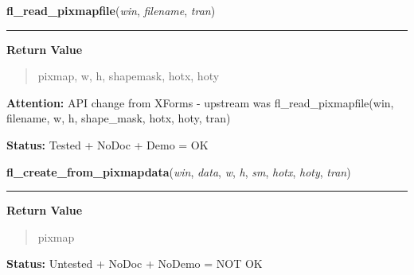 \hspace{.8\funcindent}\begin{boxedminipage}{\funcwidth}

    \raggedright \textbf{fl\_read\_pixmapfile}(\textit{win}, \textit{filename}, \textit{tran})

    \vspace{-1.5ex}

    \rule{\textwidth}{0.5\fboxrule}
\setlength{\parskip}{2ex}
\setlength{\parskip}{1ex}
      \textbf{Return Value}
    \vspace{-1ex}

      \begin{quote}
      pixmap, w, h, shapemask, hotx, hoty

      \end{quote}

\textbf{Attention:} API change from XForms - upstream was fl\_read\_pixmapfile(win, filename, 
w, h, shape\_mask, hotx, hoty, tran)



\textbf{Status:} Tested + NoDoc + Demo = OK



    \end{boxedminipage}

    \label{xformslib:flbitmap:fl_create_from_pixmapdata}

    \vspace{0.5ex}

\hspace{.8\funcindent}\begin{boxedminipage}{\funcwidth}

    \raggedright \textbf{fl\_create\_from\_pixmapdata}(\textit{win}, \textit{data}, \textit{w}, \textit{h}, \textit{sm}, \textit{hotx}, \textit{hoty}, \textit{tran})

    \vspace{-1.5ex}

    \rule{\textwidth}{0.5\fboxrule}
\setlength{\parskip}{2ex}
\setlength{\parskip}{1ex}
      \textbf{Return Value}
    \vspace{-1ex}

      \begin{quote}
      pixmap

      \end{quote}

\textbf{Status:} Untested + NoDoc + NoDemo = NOT OK



    \end{boxedminipage}

